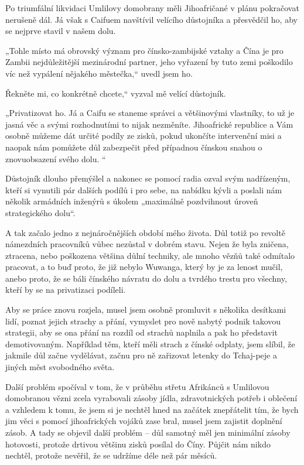 Po triumfální likvidaci Umlilovy domobrany měli Jihoafričané v plánu pokračovat nerušeně dál. Já však s Caifuem navštívil velícího důstojníka a přesvědčil ho, aby se nejprve stavil v našem dolu.

„Tohle místo má obrovský význam pro čínsko-zambijské vztahy a Čína je pro Zambii nejdůležitější mezinárodní partner, jeho vyřazení by tuto zemi poškodilo víc než vypálení nějakého městečka,“ uvedl jsem ho. 

Řekněte mi, co konkrétně chcete,“ vyzval mě velící důstojník.

„Privatizovat ho. Já a Caifu se staneme správci a většinovými vlastníky, to už je jasná věc a svými rozhodnutími to nijak nezměníte. Jihoafrické republice a Vám osobně můžeme dát určité podíly ze zisků, pokud ukončíte intervenční misi a naopak nám pomůžete důl zabezpečit před případnou čínskou snahou o znovuobsazení svého dolu. “

Důstojník dlouho přemýšlel a nakonec se pomocí radia ozval svým nadřízeným, kteří si vynutili pár dalších podílů i pro sebe, na nabídku kývli a poslali nám několik armádních inženýrů s úkolem „maximálně pozdvihnout úroveň strategického dolu“.

\vspace{0.75cm}

A tak začalo jedno z nejnáročnějších období mého života. Důl totiž po revoltě námezdních pracovníků vůbec nezůstal v dobrém stavu. Nejen že byla zničena, ztracena, nebo poškozena většina důlní techniky, ale mnoho vězňů také odmítalo pracovat, a to buď proto, že již nebylo Wuwanga, který by je za lenost mučil, anebo proto, že se báli čínského návratu do dolu a tvrdého trestu pro všechny, kteří by se na privatizaci podíleli.

Aby se práce znovu rozjela, musel jsem osobně promluvit s několika desítkami lidí, poznat jejich strachy a přání, vymyslet pro nově nabytý podnik takovou strategii, aby se ona přání na rozdíl od strachů naplnila a pak ho představit demotivovaným. Například těm, kteří měli strach z čínské odplaty, jsem slíbil, že jakmile důl začne vydělávat, začnu pro ně zařizovat letenky do Tchaj-peje a jiných měst svobodného světa.
	
Další problém spočíval v tom, že v průběhu střetu Afrikánců s Umlilovou domobranou vězni zcela vyrabovali zásoby jídla, zdravotnických potřeb i oblečení a vzhledem k tomu, že jsem si je nechtěl hned na začátek znepřátelit tím, že bych jim věci s pomocí jihoafrických vojáků zase bral, musel jsem zajistit doplnění zásob. A tady se objevil další problém – důl samotný měl jen minimální zásoby hotovosti, protože drtivou většinu zisků posílal do Číny. Půjčit nám nikdo nechtěl, protože nevěřil, že se udržíme déle než pár měsíců. 
 
